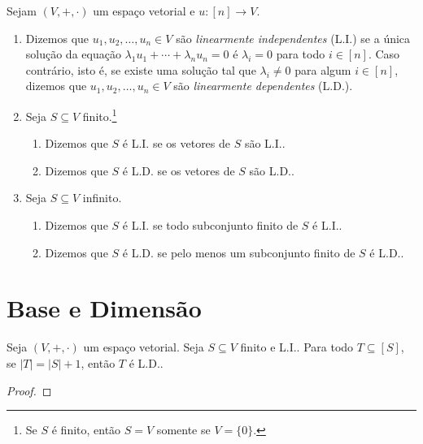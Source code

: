\begin{definition}
    Sejam $(V, +, \cdot)$ um espaço vetorial e $u : [n] \to V$.
        \begin{enumerate}[leftmargin=*, align=left, label=\textbf{(\alph*)}]
            \item Dizemos que $u_1, u_2, \ldots, u_n \in V$ são \emph{linearmente independentes} (L.I.) se a única solução da equação $\lambda_1 u_1 + \cdots + \lambda_n u_n = 0$ é $\lambda_i = 0$ para todo $i \in [n]$. Caso contrário, isto é, se existe uma solução tal que $\lambda_i \neq 0$ para algum $i \in [n]$, dizemos que $u_1, u_2, \ldots, u_n \in V$ são \emph{linearmente dependentes} (L.D.).
            \item Seja $S \subseteq V$ finito.\footnote{Se $S$ é finito, então $S = V$ somente se $V = \{ 0\}$.}
                \begin{enumerate}[label=\roman*.]
                    \item Dizemos que $S$ é L.I. se os vetores de $S$ são L.I..
                    \item Dizemos que $S$ é L.D. se os vetores de $S$ são L.D..
                \end{enumerate}
            \item Seja $S \subseteq V$ infinito.
                \begin{enumerate}[label=\roman*.]
                    \item Dizemos que $S$ é L.I. se todo subconjunto finito de $S$ é L.I..
                    \item Dizemos que $S$ é L.D. se pelo menos um subconjunto finito de $S$ é L.D..
                \end{enumerate}
        \end{enumerate}
\end{definition}

\section{Base e Dimensão}

\begin{lemma} \label{lema.alglin:steinitz}
    Seja $(V,+,\cdot)$ um espaço vetorial. Seja $S \subseteq V$ finito e L.I.. Para todo $T \subseteq [S]$, se $|T| = |S|+1$, então $T$ é L.D..
\end{lemma}

\begin{proof}
    \blackproof
\end{proof}

